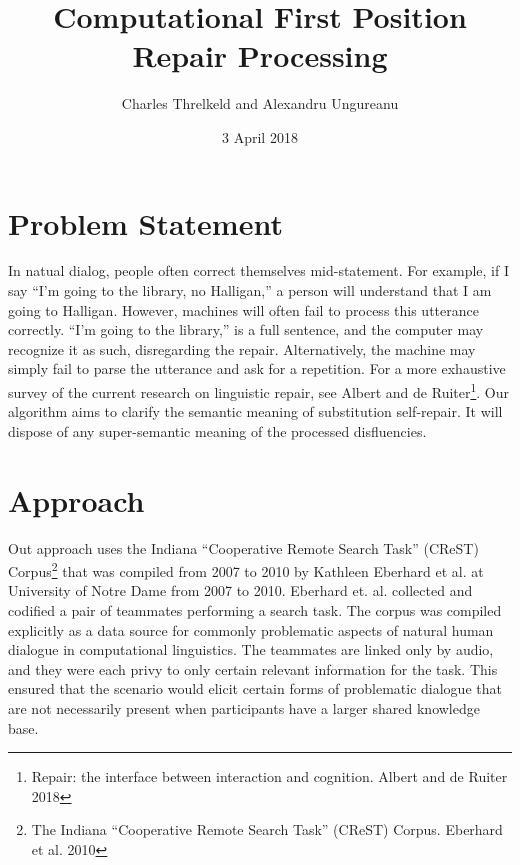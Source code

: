 \documentclass{article}
\title{Computational First Position Repair Processing}
\author{Charles Threlkeld and Alexandru Ungureanu}
\date{3 April 2018}
\begin{document}
\maketitle

\section{Problem Statement}

\begin{flushleft}
In natual dialog, people often correct themselves mid-statement. For example, if I say ``I'm going to the library, no Halligan,'' a person will understand that I am going to Halligan. However, machines will often fail to process this utterance correctly. ``I'm going to the library,'' is a full sentence, and the computer may recognize it as such, disregarding the repair. Alternatively, the machine may simply fail to parse the utterance and ask for a repetition. For a more exhaustive survey of the current research on linguistic repair, see Albert and de Ruiter\footnote{Repair: the interface between interaction and cognition. Albert and de Ruiter 2018}. Our algorithm aims to clarify the semantic meaning of substitution self-repair. It will dispose of any super-semantic meaning of the processed disfluencies.

\end{flushleft}

\section{Approach}

\begin{flushleft}

  Out approach uses the Indiana ``Cooperative Remote Search Task'' (CReST) Corpus\footnote{The Indiana ``Cooperative Remote Search Task'' (CReST) Corpus. Eberhard et al. 2010} that was compiled from 2007 to 2010 by Kathleen Eberhard et al. at University of Notre Dame from 2007 to 2010. Eberhard et. al. collected and codified a pair of teammates performing a search task. The corpus was compiled explicitly as a data source for commonly problematic aspects of natural human dialogue in computational linguistics. The teammates are linked only by audio, and they were each privy to only certain relevant information for the task. This ensured that the scenario would elicit certain forms of problematic dialogue that are not necessarily present when participants have a larger shared knowledge base.

\end{flushleft}
\end{document}

